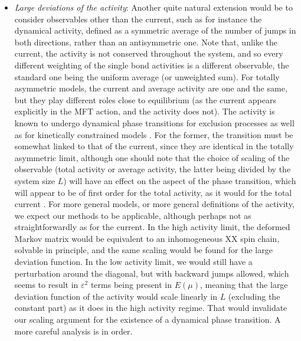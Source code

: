 \documentclass[aps,pre,onecolumn,showpacs,showkeys,a4paper]{revtex4-1}
\begin{document}
\begin{itemize}
\item \textit{Large deviations of the activity}: Another quite natural extension would be to consider observables other than the current, such as for instance the dynamical activity, defined as a symmetric average of the number of jumps in both directions, rather than an antisymmetric one. Note that, unlike the current, the activity is not conserved throughout the system, and so every different weighting of the single bond activities is a different observable, the standard one being the uniform average (or unweighted sum). For totally asymmetric models, the current and average activity are one and the same, but they play different roles close to equilibrium (as the current appears explicitly in the MFT action, and the activity does not). The activity is known to undergo dynamical phase transitions for exclusion processes \cite{Bodineau2008,Lecomte2012,Jack2015} as well as for kinetically constrained models \cite{Garrahan2009,Nemoto2016,Nemoto2014}. For the former, the transition must be somewhat linked to that of the current, since they are identical in the totally asymmetric limit, although one should note that the choice of scaling of the observable (total activity or average activity, the latter being divided by the system size $L$) will have an effect on the aspect of the phase transition, which will appear to be of first order for the total activity, as it would for the total current \cite{Jack2015,1751-8121-44-11-115005}. For more general models, or more general definitions of the activity, we expect our methods to be applicable, although perhaps not as straightforwardly as for the current. In the high activity limit, the deformed Markov matrix would be equivalent to an inhomogeneous XX spin chain, solvable in principle, and the same scaling would be found for the large deviation function. In the low activity limit, we would still have a perturbation around the diagonal, but with backward jumps allowed, which seems to result in $\varepsilon^2$ terms being present in $E(\mu)$, meaning that the large deviation function of the activity would scale linearly in $L$ (excluding the constant part) as it does in the high activity regime. That would invalidate our scaling argument for the existence of a dynamical phase transition. A more careful analysis is in order.

\end{itemize}
\end{document}
